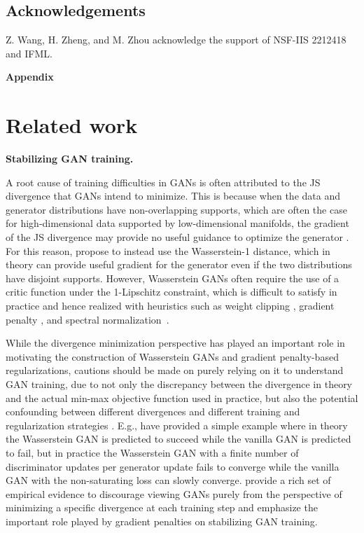 \documentclass{article} \usepackage{iclr2023_conference,times}
\theoremstyle{plain}
\theoremstyle{definition}
\theoremstyle{remark}
\begin{document}
\subsection*{Acknowledgements}

Z. Wang, H. Zheng, and M. Zhou acknowledge the support of NSF-IIS 2212418 and IFML.





\newpage
\appendix

\begin{center}{\Large{\textbf{Appendix}}}\end{center}


\section{Related work} \label{appendix:related_work}


\textbf{Stabilizing GAN training. } 

A root cause of training difficulties
in GANs is often attributed to the JS divergence that GANs intend to minimize. 
This is because when the data and generator distributions have non-overlapping supports, which are often the case for high-dimensional data supported by low-dimensional manifolds, the gradient of the JS divergence may provide no useful guidance to optimize the generator \citep{Arjovsky2017TowardsPM,arjovsky2017wasserstein, mescheder2018training, roth2017stabilizing}.  For this reason, \citet{arjovsky2017wasserstein} propose to instead use 
the Wasserstein-1 distance, 
which in theory
can provide useful gradient for the generator even if the two distributions have disjoint supports.
However, Wasserstein GANs often require the use of a critic function under the 1-Lipschitz constraint, which is difficult to satisfy in practice and hence realized with heuristics such as weight clipping \citep{arjovsky2017wasserstein}, gradient penalty \citep{gulrajani2017improved}, and spectral normalization~\citep{Miyato2018SpectralNF}.


While the divergence minimization perspective has played an important role in motivating the construction of Wasserstein GANs and gradient penalty-based regularizations, cautions should be made on purely relying on it 
to understand GAN training, due to not only the discrepancy between the divergence in theory and the actual min-max objective function used in practice, but also the  potential confounding between different divergences and different training  and regularization strategies \citep{fedus2018many,mescheder2018training}. E.g.,   \citet{mescheder2018training} have provided a simple example where in theory the Wasserstein GAN is predicted to succeed while the vanilla GAN is predicted to fail, but in practice the Wasserstein GAN with a finite number of discriminator updates per generator update fails to converge while the vanilla GAN 
with the non-saturating loss can slowly converge. 
\citet{fedus2018many} provide a rich set of empirical evidence to discourage viewing GANs purely from the perspective of minimizing a specific divergence at each training step and emphasize the important role played by gradient penalties on stabilizing GAN training. 
\end{document}
